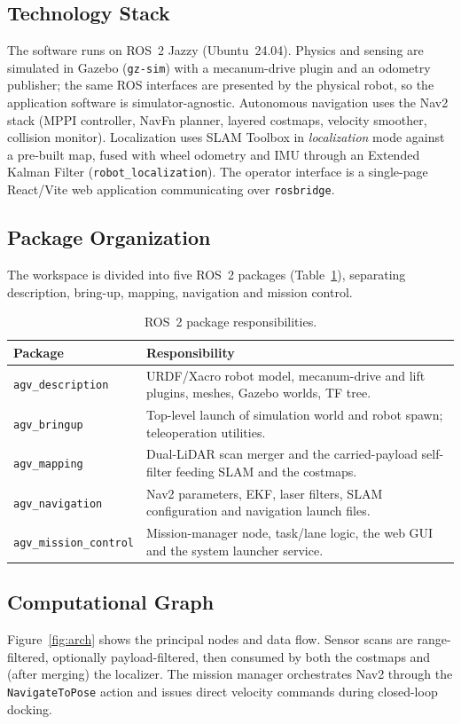 \documentclass[11pt,a4paper]{article}
\newcommand{\code}[1]{\texttt{\small #1}}
\begin{document}
\subsection{Technology Stack}
The software runs on ROS~2 Jazzy (Ubuntu~24.04). Physics and sensing are
simulated in Gazebo (\code{gz-sim}) with a mecanum-drive plugin and an
odometry publisher; the same ROS interfaces are presented by the physical
robot, so the application software is simulator-agnostic. Autonomous
navigation uses the Nav2 stack (MPPI controller, NavFn planner, layered
costmaps, velocity smoother, collision monitor). Localization uses SLAM
Toolbox in \emph{localization} mode against a pre-built map, fused with
wheel odometry and IMU through an Extended Kalman Filter
(\code{robot\_localization}). The operator interface is a single-page
React/Vite web application communicating over \code{rosbridge}.

\subsection{Package Organization}
The workspace is divided into five ROS~2 packages
(Table~\ref{tab:packages}), separating description, bring-up, mapping,
navigation and mission control.

\begin{table}[h]\centering\small
\caption{ROS~2 package responsibilities.}\label{tab:packages}
\begin{tabular}{@{}lp{11.2cm}@{}}
\toprule
\textbf{Package} & \textbf{Responsibility}\\
\midrule
\code{agv\_description}   & URDF/Xacro robot model, mecanum-drive and lift
 plugins, meshes, Gazebo worlds, TF tree.\\
\code{agv\_bringup}       & Top-level launch of simulation world and robot
 spawn; teleoperation utilities.\\
\code{agv\_mapping}       & Dual-LiDAR scan merger and the carried-payload
 self-filter feeding SLAM and the costmaps.\\
\code{agv\_navigation}    & Nav2 parameters, EKF, laser filters, SLAM
 configuration and navigation launch files.\\
\code{agv\_mission\_control} & Mission-manager node, task/lane logic, the web
 GUI and the system launcher service.\\
\bottomrule
\end{tabular}
\end{table}

\subsection{Computational Graph}
Figure~\ref{fig:arch} shows the principal nodes and data flow. Sensor scans
are range-filtered, optionally payload-filtered, then consumed by both the
costmaps and (after merging) the localizer. The mission manager orchestrates
Nav2 through the \code{NavigateToPose} action and issues direct velocity
commands during closed-loop docking.
\end{document}
